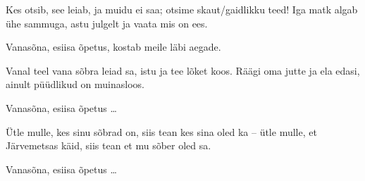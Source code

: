 Kes otsib, see leiab, ja muidu ei saa;
otsime skaut/gaidlikku teed!
Iga matk algab \"uhe sammuga,
astu julgelt ja vaata mis on ees.

Vanas\~ona, esiisa \~opetus,
kostab meile l\"abi aegade.

Vanal teel vana s\~obra leiad sa,
istu ja tee l\~oket koos.
R\"a\"agi oma jutte ja ela edasi,
ainult p\"u\"udlikud on muinasloos.

Vanas\~ona, esiisa \~opetus \ldots

\"Utle mulle, kes sinu s\~obrad on,
siis tean kes sina oled ka --
\"utle mulle, et J\"arvemetsas k\"aid,
siis tean et mu s\~ober oled sa.

Vanas\~ona, esiisa \~opetus \ldots